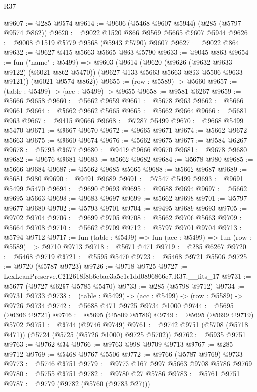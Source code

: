 \begin{lexlean}{R37}
\begin{coremodule}
@9607 := @285 @9574
@9614 := @9606 (@5468 @9607 @5944) (@285 (@5797 @9574 @862))
@9620 := @9022 @1520 @866 @9569 @5665 @9607 @5944
@9626 := @9008 @1519 @5779 @9568 (@5943 @5790) @9607
@9627 := @9022 @864
@9632 := @9627 @415 @5663 @5665 @863 @5790
@9633 := @9045 @863
@9654 := fun ("name" : @5499) =>
  @9603
    (@9614
      (@9620
        (@9626 (@9632 @9633 @9122) (@6021 @862 @5470))
        (@9627 @133 @5663 @5663 @863 @5506 @9633 @9121))
      (@6021 @9574 @862))
@9655 := (row : @5589) -> @5660
@9657 := (table : @5499) -> (acc : @5499) -> @9655
@9658 := @9581 @6267
@9659 := @5666 @9658
@9660 := @5662 @9659
@9661 := @5678 @963
@9662 := @5666 @9661
@9664 := @5662 @9662 @5665
@9665 := @5662 @9664
@9666 := @5681 @963
@9667 := @9415 @9666
@9668 := @7287 @5499
@9670 := @9668 @5499 @5470
@9671 := @9667 @9670
@9672 := @9665 @9671
@9674 := @5662 @9672 @5663
@9675 := @9660 @9674
@9676 := @5662 @9675
@9677 := @9584 @6267
@9678 := @5793 @9677
@9680 := @9419 @9666 @9670
@9681 := @9678 @9680
@9682 := @9676 @9681
@9683 := @5662 @9682
@9684 := @5678 @980
@9685 := @5666 @9684
@9687 := @5662 @9685 @5665
@9688 := @5662 @9687
@9689 := @5681 @980
@9690 := @9491 @9689
@9691 := @7547 @5499
@9693 := @9691 @5499 @5470
@9694 := @9690 @9693
@9695 := @9688 @9694
@9697 := @5662 @9695 @5663
@9698 := @9683 @9697
@9699 := @5662 @9698
@9701 := @5797 @9677 @9680
@9702 := @5793 @9701
@9704 := @9495 @9689 @9693
@9705 := @9702 @9704
@9706 := @9699 @9705
@9708 := @5662 @9706 @5663
@9709 := @5664 @9708
@9710 := @5662 @9709
@9712 := @5797 @9701 @9704
@9713 := @5794 @9712
@9717 := fun (table : @5499) => fun (acc : @5499) => fun (row : @5589) => @9710 @9713
@9718 := @5671 @471
@9719 := @285 @6267
@9720 := @5468 @9719
@9721 := @5595 @5470
@9723 := @5468 @9721 @5506
@9725 := @9720 (@5787 @9723)
@9726 := @9718 @9725
@9727 := LexLeanPreserve.C212618f8b6ebac3a5c1e1dd0896866e7.R37.__fits_17
@9731 := @5677 (@9727 @6267 @5785 @5470)
@9733 := @285 (@5798 @9712)
@9734 := @9731 @9733
@9738 := (table : @5499) -> (acc : @5499) -> (row : @5589) -> @9726 @9734
@9742 := @5688 @471 @9725 @9734 @1000
@9744 := @5695 (@6366 @9721)
@9746 := @5695 (@5809 @5786)
@9749 := @5695 (@5699 @9719) @5702
@9751 := @9744 (@9746 @9749)
@9761 := @9742 @9751 (@5708 (@5718 @471)) (@5724 (@5725 (@5726 @1000) @9725 @5702))
@9762 := @5935 @9751
@9763 := @9762 @34
@9766 := @9763 @998 @9709 @9713
@9767 := @285 @9712
@9769 := @5468 @9767 @5506
@9772 := @9766 (@5787 @9769) @9733
@9773 := @5746 @9751
@9779 := @9773 @167 @997 @5663 @9708 @5786 @9769
@9780 := @5755 @9751
@9782 := @9780 @27 @5786
@9783 := @5761 @9751
@9787 := @9779 (@9782 (@5760 (@9783 @27)))

\end{coremodule}
\end{lexlean}
